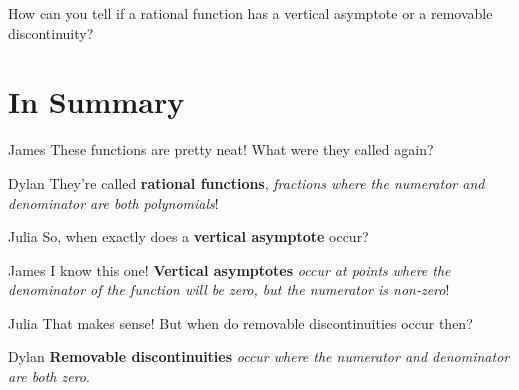 \documentclass{ximera}
\begin{document}
\begin{question}
How can you tell if a rational function has a vertical asymptote or a removable discontinuity?
\begin{multipleChoice}
\end{multipleChoice}
\end{question}

\section{In Summary}
\begin{dialogue}
\item[James] These functions are pretty neat! What were they called again?
\item[Dylan] They're called \textbf{rational functions}, \textit{fractions where the numerator and denominator are both polynomials}!
\item[Julia] So, when exactly does a \textbf{vertical asymptote} occur?
\item[James] I know this one! \textbf{Vertical asymptotes} \textit{occur at points where the denominator of the function will be zero, but the numerator is non-zero}!
\item[Julia] That makes sense! But when do removable discontinuities occur then?
\item[Dylan] \textbf{Removable discontinuities} \textit{occur where the numerator and denominator are both zero}.
\end{dialogue}
\end{document}
